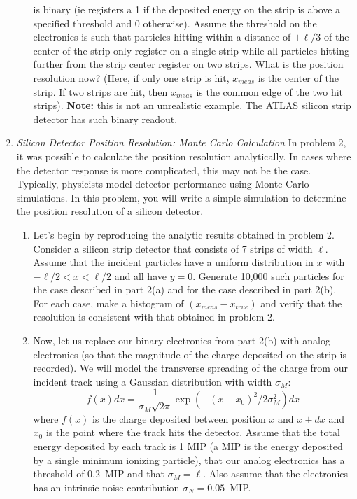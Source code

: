 \documentclass[12pt]{article}
\begin{document}
\begin{enumerate}
\begin{enumerate}
is binary (ie registers a 1 if the deposited energy on the
strip is above a specified threshold
and 0 otherwise). Assume the threshold on the electronics is
such that particles hitting within
a  distance of $\pm \ell/3 $ of the center of the strip only register on
a single strip while all particles hitting further from the strip
center register on two strips.  
What is the position resolution now? (Here, if
only one strip is hit, $x_{meas}$ is the center of the strip.  If
two strips are hit, then $x_{meas}$ is the common edge of the two
hit strips).  {\bf Note:} this is not an unrealistic example.  The ATLAS silicon
strip detector has such binary readout.
\end{enumerate}
\item {\it Silicon Detector Position Resolution:  Monte Carlo Calculation} 
In problem 2, 
it was possible to calculate the position resolution 
analytically.  In cases where the detector response is more complicated,
this may not be the case.  Typically, physicists model
detector performance using Monte Carlo simulations.
In this problem, you will write a 
simple simulation  to determine the position resolution of a silicon 
detector.
\begin{enumerate}
\item Let's begin by reproducing the analytic results obtained in problem 2.
Consider a silicon strip detector that consists of 7 strips of width
$\ell$.  
Assume that the incident particles have a uniform distribution
in $x$ with $-\ell/2 < x < \ell/2$ and all have $y=0$.
Generate 10,000 such particles for
the case described in part 2(a) and for the case described
in part 2(b).
For each case, make a histogram of $(x_{meas}-x_{true})$ and 
verify that
the resolution 
is consistent with that  obtained in problem 2.  
\item Now,
let us replace our binary electronics from part 2(b)
with analog electronics (so that the magnitude
of the charge deposited on the strip is recorded).
We will model the transverse spreading of the charge from our incident
track using a Gaussian distribution with width $\sigma_M$: 
$$ f(x)dx = \frac{1}{\sigma_M\sqrt{2\pi}} \exp(-(x-x_0)^2/2\sigma_M^2)dx$$
where $f(x)$ is the charge deposited between position $x$ and $x+dx$
and $x_0$ is the point where the track hits the detector.
Assume that the total energy deposited by each track is 1 MIP (a MIP is
the energy deposited by a single minimum ionizing particle), that our
analog electronics has a threshold of 0.2~MIP and that
$\sigma_M=\ell$.  Also assume that
the electronics has an intrinsic noise contribution $\sigma_N=0.05$~MIP.

\end{enumerate}
\end{enumerate}
\end{document}
